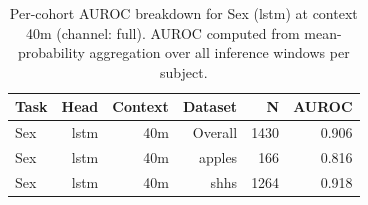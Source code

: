 \begin{table}[ht]
\centering
\caption{Per-cohort AUROC breakdown for Sex (lstm) at context 40m (channel: full). AUROC computed from mean-probability aggregation over all inference windows per subject.}
\label{tab:cohort_sex_binary_lstm_full}
\begin{tabular}{lrrrrr}
\toprule
Task & Head & Context & Dataset & N & AUROC \\
\midrule
Sex & lstm & 40m & Overall & 1430 & 0.906 \\
Sex & lstm & 40m & apples & 166 & 0.816 \\
Sex & lstm & 40m & shhs & 1264 & 0.918 \\
\bottomrule
\end{tabular}
\end{table}
